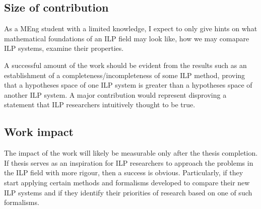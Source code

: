 \subsection{Size of contribution}
As a MEng student with a limited knowledge, I expect to only give hints on what mathematical foundations of an ILP field may look like, how we may comapare ILP systems, examine their properties.

A successful amount of the work should be evident from the results such as an establishment of a completeness/incompleteness of some ILP method, proving that a hypotheses space of one ILP system is greater than a hypotheses space of another ILP system. A major contribution would represent disproving a statement that ILP researchers intuitively thought to be true.

\subsection{Work impact}
The impact of the work will likely be measurable only after the thesis completion. If thesis serves as an inspiration for ILP researchers to approach the problems in the ILP field with more rigour, then a success is obvious. Particularly, if they start applying certain methods and formalisms developed to compare their new ILP systems and if they identify their priorities of research based on one of such formalisms.

